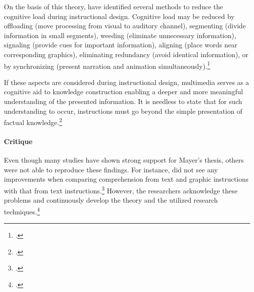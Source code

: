 On the basis of this theory, \cite{MayerNineWaysReduce2003} have identified several methods to reduce the cognitive load during instructional design. Cognitive load may be reduced by offloading (move processing from visual to auditory channel), segmenting (divide information in small segments), weeding (eliminate unnecessary information), signaling (provide cues for important information), aligning (place words near corresponding graphics), eliminating redundancy (avoid identical information), or by synchronizing (present narration and animation simultaneously).\footcites[Cf.][p.46]{MayerNineWaysReduce2003}

If these aspects are considered during instructional design, multimedia serves as a cognitive aid to knowledge construction enabling a deeper and more meaningful understanding of the presented information. It is needless to state that for such understanding to occur, instructions must go beyond the simple presentation of factual knowledge.\footcites[Cf.][p.229]{MayerRotemeaningfullearning2002}

\paragraph{Critique} Even though many studies have shown strong support for Mayer's thesis, others were not able to reproduce these findings. For instance, \cite{RaschInteractivenoninteractivepictures2009} did not see any improvements when comparing comprehension from text and graphic instructions with that from text instructions.\footcites[Cf.][]{RaschInteractivenoninteractivepictures2009} However, the researchers acknowledge these problems and continuously develop the theory and the utilized research techniques.\footcites[Cf.][p.52]{SordenCognitiveTheoryMultimedia2012} 

